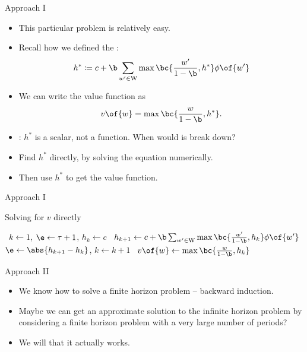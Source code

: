 \documentclass[11pt,xcolor={dvipsnames},aspectratio=159,hyperref={pdftex,pdfpagemode=UseNone,hidelinks,pdfdisplaydoctitle=true},usepdftitle=false]{beamer}
\begin{document}
\begin{frame}{Approach I}
    \begin{itemize}
        \item This particular problem is relatively easy. 
        \item Recall how we defined the : \begin{align*}
            h^* \coloneq c + \b \sum_{w^\prime \in \text{W}} \max \bc{\frac{w^\prime}{1-\b},h^*} \phi\of{w^\prime}
        \end{align*}
    \item We can write the value function as 
    \begin{align*}
        v\of{w} = \max \bc{\frac{w}{1-\b}, h^*}.
    \end{align*}
    \item {}: $h^*$ is a scalar, not a function. When would is break down?
    \item Find $h^*$ directly, by solving the equation numerically. 
    \item Then use $h^*$ to get the value function.     
\end{itemize}
\end{frame}

\begin{frame}{Approach I}
    \begin{algorithm}[H]
        \caption{Solving for $v$ directly}
        \begin{algorithmic}[1]
         \
        \State $k \gets 1$, $\e \gets \tau + 1$, $h_k \gets c$
        \While{$\e>\tau$} \
        \State $h_{k+1}\gets  c + \b \sum_{w^\prime \in \text{W}} \max \bc{\frac{w^\prime}{1-\b},h_k} \phi\of{w^\prime}$
        \State $\e \gets \abs{h_{k+1}-h_k}$, $k \gets k+1$
        \EndWhile
        \For{$w \in \text{W}$} \
        \State $v\of{w} \gets \max \bc{\frac{w}{1-\b}, h_k}$
        \EndFor
        \EndProcedure
        \end{algorithmic}
        \end{algorithm}
\end{frame}

\begin{frame}{Approach II}
    \begin{itemize}
        \item We know how to solve a finite horizon problem -- backward induction.
        \item Maybe we can get an approximate solution to the infinite horizon problem by considering a finite horizon problem with a very large number of periods?
        \item We will  that it actually works.       
\end{itemize}
\end{frame}
\end{document}
